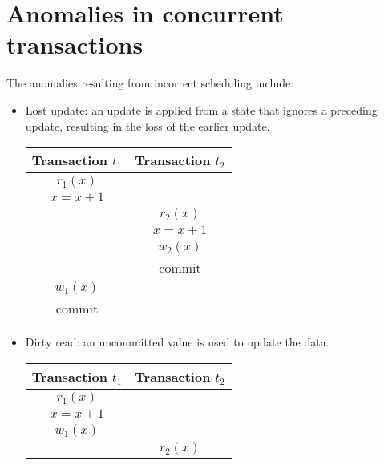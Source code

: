 \section{Anomalies in concurrent transactions}

The anomalies resulting from incorrect scheduling include:
\begin{itemize}
    \item Lost update: an update is applied from a state that ignores a preceding update, resulting in the loss of the earlier update.
        \begin{table}[H]
            \centering
            \begin{tabular}{c|c}
            \textbf{Transaction $t_1$}    & \textbf{Transaction $t_2$} \\ \hline
            $r_1(x)$                      &                            \\
            $x=x+1$                       &                            \\
                                            & $r_2(x)$                   \\
                                            & $x=x+1$                    \\
                                            & $w_2(x)$                   \\
                                            & commit                     \\
            $w_1(x)$                      &                            \\
            commit                        &                           
            \end{tabular}
        \end{table}
    \item Dirty read: an uncommitted value is used to update the data.
        \begin{table}[H]
            \centering
            \begin{tabular}{c|c}
            \textbf{Transaction $t_1$} & \textbf{Transaction $t_2$} \\ \hline
            $r_1(x)$                   &                            \\
            $x=x+1$                    &                            \\
            $w_1(x)$                   &                            \\
                                    & $r_2(x)$                   \\

\end{tabular}
\end{table}
\end{itemize}
